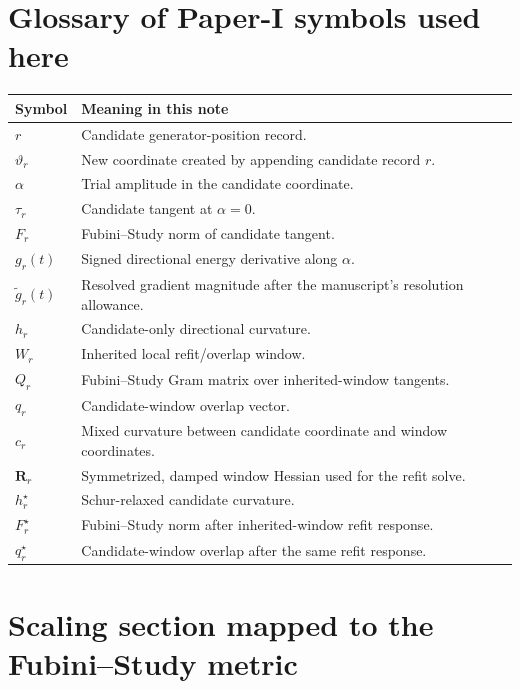 \documentclass[10pt,twocolumn]{article}
\begin{document}
\section{Glossary of Paper-I symbols used here}

\begin{center}
\footnotesize
\begin{tabular}{>{\raggedright\arraybackslash}p{}
>{\raggedright\arraybackslash}p{}}
\toprule
Symbol & Meaning in this note\\
\midrule
\(r\) & Candidate generator-position record.\\
\(\vartheta_r\) & New coordinate created by appending candidate record \(r\).\\
\(\alpha\) & Trial amplitude in the candidate coordinate.\\
\(\tau_r\) & Candidate tangent at \(\alpha=0\).\\
\(F_r\) & Fubini--Study norm of candidate tangent.\\
\(g_r(t)\) & Signed directional energy derivative along \(\alpha\).\\
\(\widetilde g_r(t)\) & Resolved gradient magnitude after the manuscript's resolution allowance.\\
\(h_r\) & Candidate-only directional curvature.\\
\(W_r\) & Inherited local refit/overlap window.\\
\(Q_r\) & Fubini--Study Gram matrix over inherited-window tangents.\\
\(q_r\) & Candidate-window overlap vector.\\
\(c_r\) & Mixed curvature between candidate coordinate and window coordinates.\\
\(\mathbf R_r\) & Symmetrized, damped window Hessian used for the refit solve.\\
\(h_r^\star\) & Schur-relaxed candidate curvature.\\
\(F_r^\star\) & Fubini--Study norm after inherited-window refit response.\\
\(q_r^\star\) & Candidate-window overlap after the same refit response.\\
\bottomrule
\end{tabular}
\end{center}

\section{Scaling section mapped to the Fubini--Study metric}
\end{document}
